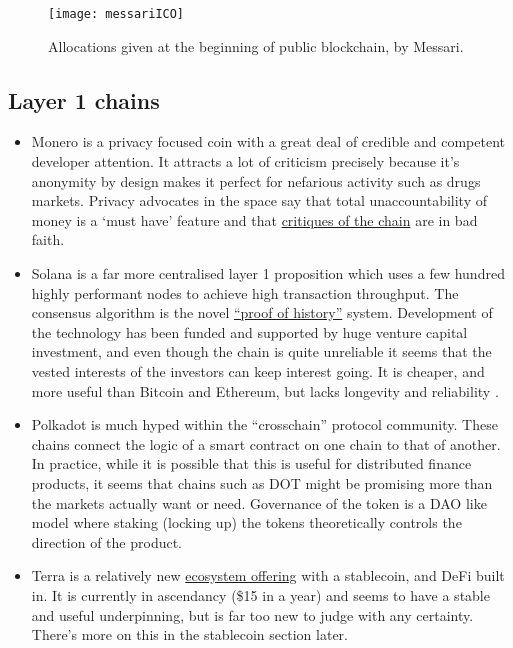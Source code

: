 \begin{figure}
  \centering
    \texttt{[image: messariICO]}
  \caption{Allocations given at the beginning of public blockchain, by Messari.}
  \label{fig:messariICO}
\end{figure}

\subsection{Layer 1 chains}

\begin{itemize}
\item Monero is a privacy focused coin with a great deal of credible and competent developer attention. It attracts a lot of criticism precisely because it's anonymity by design makes it perfect for nefarious activity such as drugs markets. Privacy advocates in the space say that total unaccountability of money is a `must have' feature and that \href{https://sethforprivacy.com/posts/dispelling-monero-fud/#introduction}{critiques of the chain} are in bad faith.
\item Solana is a far more centralised layer 1 proposition which uses a few hundred highly performant nodes to achieve high transaction throughput. The consensus algorithm is the novel \href{https://solana.com/solana-whitepaper.pdf}{``proof of history''} system. Development of the technology has been funded and supported by huge venture capital investment, and even though the chain is quite unreliable it seems that the vested interests of the investors can keep interest going. It is cheaper, and more useful than Bitcoin and Ethereum, but lacks longevity and reliability . 
\item Polkadot is much hyped within the ``crosschain'' protocol community. These chains connect the logic of a smart contract on one chain to that of another. In practice, while it is possible that this is useful for distributed finance products, it seems that chains such as DOT might be promising more than the markets actually want or need. Governance of the token is a DAO like model where staking (locking up) the tokens theoretically controls the direction of the product.
\item Terra is a relatively new \href{https://assets.website-files.com/611153e7af981472d8da199c/618b02d13e938ae1f8ad1e45_Terra_White_paper.pdf}{ecosystem offering} with a stablecoin, and DeFi built in. It is currently in ascendancy (\$15 in a year) and seems to have a stable and useful underpinning, but is far too new to judge with any certainty. There's more on this in the stablecoin section later.

\end{itemize}
